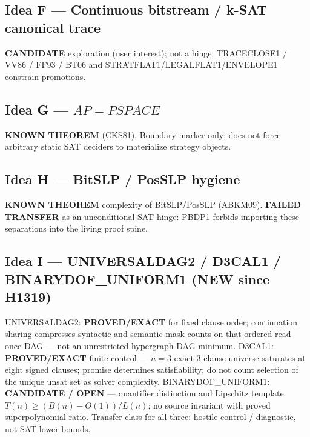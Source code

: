\documentclass[11pt]{article}
\begin{document}
\subsection*{Idea F --- Continuous bitstream / k-SAT canonical trace}
\textbf{CANDIDATE} exploration (user interest); not a hinge. TRACECLOSE1 / VV86 / FF93 / BT06
and STRATFLAT1/LEGALFLAT1/ENVELOPE1 constrain promotions.

\subsection*{Idea G --- $AP=PSPACE$}
\textbf{KNOWN THEOREM} (CKS81). Boundary marker only; does not force arbitrary static SAT
deciders to materialize strategy objects.

\subsection*{Idea H --- BitSLP / PosSLP hygiene}
\textbf{KNOWN THEOREM} complexity of BitSLP/PosSLP (ABKM09). \textbf{FAILED TRANSFER}
as an unconditional SAT hinge: PBDP1 forbids importing these separations into the living proof spine.

\subsection*{Idea I --- UNIVERSALDAG2 / D3CAL1 / BINARYDOF\_UNIFORM1 (NEW since H1319)}
UNIVERSALDAG2: \textbf{PROVED/EXACT} for fixed clause order; continuation sharing compresses
syntactic and semantic-mask counts on that ordered read-once DAG --- not an unrestricted
hypergraph-DAG minimum.
D3CAL1: \textbf{PROVED/EXACT} finite control --- $n=3$ exact-3 clause universe saturates at
eight signed clauses; promise determines satisfiability; do not count selection of the unique
unsat set as solver complexity.
BINARYDOF\_UNIFORM1: \textbf{CANDIDATE / OPEN} --- quantifier distinction and Lipschitz
template $T(n)\ge (B(n)-O(1))/L(n)$; no source invariant with proved superpolynomial ratio.
Transfer class for all three: hostile-control / diagnostic, not SAT lower bounds.
\end{document}
